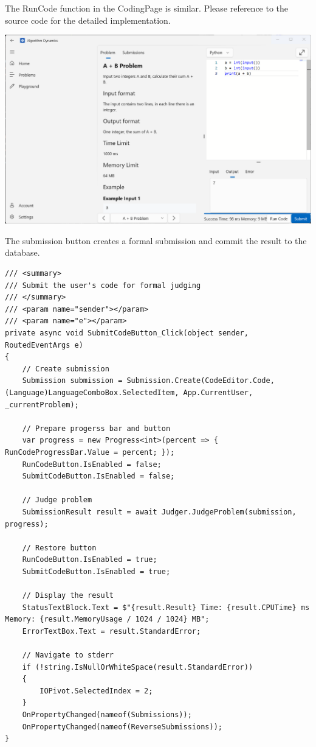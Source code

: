 \documentclass[a4paper]{report}
\begin{document}
The RunCode function in the CodingPage is similar. Please reference to the source code for the detailed implementation.

\includegraphics[width=\textwidth, height=\textheight, keepaspectratio]{CodingPage-RunCode}

The submission button creates a formal submission and commit the result to the database.

\begin{verbatim}
/// <summary>
/// Submit the user's code for formal judging
/// </summary>
/// <param name="sender"></param>
/// <param name="e"></param>
private async void SubmitCodeButton_Click(object sender, RoutedEventArgs e)
{
    // Create submission
    Submission submission = Submission.Create(CodeEditor.Code, (Language)LanguageComboBox.SelectedItem, App.CurrentUser, _currentProblem);
    
    // Prepare progerss bar and button
    var progress = new Progress<int>(percent => { RunCodeProgressBar.Value = percent; });
    RunCodeButton.IsEnabled = false;
    SubmitCodeButton.IsEnabled = false;

    // Judge problem
    SubmissionResult result = await Judger.JudgeProblem(submission, progress);

    // Restore button
    RunCodeButton.IsEnabled = true;
    SubmitCodeButton.IsEnabled = true;

    // Display the result
    StatusTextBlock.Text = $"{result.Result} Time: {result.CPUTime} ms Memory: {result.MemoryUsage / 1024 / 1024} MB";
    ErrorTextBox.Text = result.StandardError;
    
    // Navigate to stderr
    if (!string.IsNullOrWhiteSpace(result.StandardError))
    {
        IOPivot.SelectedIndex = 2;
    }
    OnPropertyChanged(nameof(Submissions));
    OnPropertyChanged(nameof(ReverseSubmissions));
}
\end{verbatim}
\end{document}

